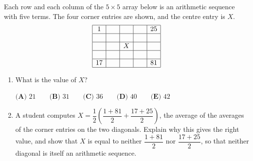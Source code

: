 Each row and each column of the $5\times5$ array below is an arithmetic sequence with five terms. The four corner entries are shown, and the centre entry is $X$.
\[\begin{array}{|c|c|c|c|c|}\hline
1&\phantom{00}&\phantom{00}&\phantom{00}&25\\\hline
\vphantom{1}&&&&\\\hline
&&X&&\\\hline
\vphantom{1}&&&&\\\hline
17&&&&81\\\hline
\end{array}\]
\begin{enumerate}
\item[(a)] What is the value of $X$?

$\textbf{(A) }21\qquad\textbf{(B) }31\qquad\textbf{(C) }36\qquad\textbf{(D) }40\qquad\textbf{(E) }42$
\item[(b)] A student computes $X=\dfrac12\left(\dfrac{1+81}{2}+\dfrac{17+25}{2}\right)$, the average of the averages of the corner entries on the two diagonals. Explain why this gives the right value, and show that $X$ is equal to neither $\dfrac{1+81}{2}$ nor $\dfrac{17+25}{2}$, so that neither diagonal is itself an arithmetic sequence.
\end{enumerate}
